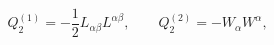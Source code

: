 \begin{equation}
Q^{(1)}_2=-\frac{1}{2}L_{\alpha\beta}L^{\alpha\beta},\qquad
Q^{(2)}_2=-W_{\alpha}W^{\alpha},\label{eq:cas}
\end{equation}

